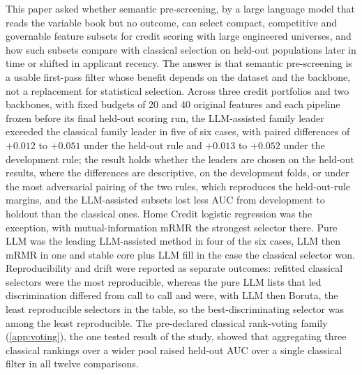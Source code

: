 \documentclass[final,5p,twocolumn]{elsarticle}
\begin{document}
This paper asked whether semantic pre-screening, by a large language model that reads the variable book but no outcome, can select compact, competitive and governable feature subsets for credit scoring with large engineered universes, and how such subsets compare with classical selection on held-out populations later in time or shifted in applicant recency. The answer is that semantic pre-screening is a usable first-pass filter whose benefit depends on the dataset and the backbone, not a replacement for statistical selection. Across three credit portfolios and two backbones, with fixed budgets of 20 and 40 original features and each pipeline frozen before its final held-out scoring run, the LLM-assisted family leader exceeded the classical family leader in five of six cases, with paired differences of $+0.012$ to $+0.051$ under the held-out rule and $+0.013$ to $+0.052$ under the development rule; the result holds whether the leaders are chosen on the held-out results, where the differences are descriptive, on the development folds, or under the most adversarial pairing of the two rules, which reproduces the held-out-rule margins, and the LLM-assisted subsets lost less AUC from development to holdout than the classical ones. Home Credit logistic regression was the exception, with mutual-information mRMR the strongest selector there. Pure LLM was the leading LLM-assisted method in four of the six cases, LLM then mRMR in one and stable core plus LLM fill in the case the classical selector won. Reproducibility and drift were reported as separate outcomes: refitted classical selectors were the most reproducible, whereas the pure LLM lists that led discrimination differed from call to call and were, with LLM then Boruta, the least reproducible selectors in the table, so the best-discriminating selector was among the least reproducible. The pre-declared classical rank-voting family (\ref{app:voting}), the one tested result of the study, showed that aggregating three classical rankings over a wider pool raised held-out AUC over a single classical filter in all twelve comparisons.
\end{document}
